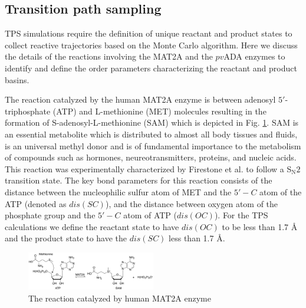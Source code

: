 \documentclass[journal=jpcbfk,manuscript=article,layout=twocolumn]{achemso}
\begin{document}
\subsection{Transition path sampling}
TPS simulations require the definition of unique reactant and product states
to collect reactive trajectories based on the Monte Carlo algorithm. Here we 
discuss the details of the reactions involving the MAT2A and the $pv$ADA enzymes 
to identify and define the order parameters characterizing the reactant and product basins.  

The reaction catalyzed by the human MAT2A enzyme is
between adenosyl $5'$-triphosphate (ATP) and L-methionine (MET) molecules resulting in the formation of
S-adenosyl-L-methionine (SAM) which is depicted in Fig. \ref{fig:mat2a-reaction}.
SAM is an essential metabolite which is distributed to almost all 
body tissues and fluids, is an universal methyl donor and is of
fundamental importance to the metabolism of compounds such as hormones, neureotransmitters, proteins, 
and nucleic acids. \cite{Friedel89Drugs38p389} This reaction was experimentally characterized by 
Firestone et al. \cite{Firestone17JAmChemSoc139p13754} to follow a S$_{\text{N}}2$ transition 
state. The key bond parameters for this reaction consists of the distance between the
nucleophilic sulfur atom of MET and the $5'-C$ atom of the ATP (denoted as $dis(SC)$), and the distance between 
oxygen atom of the phosphate group and the $5'-C$ atom of ATP ($dis(OC)$).
For the TPS calculations we define the reactant state to have $dis(OC)$ to be 
less than 1.7 {\AA} and the product state to have the $dis(SC)$ less than 1.7 {\AA}. 

\begin{figure}
\includegraphics[width=0.5\textwidth]{figures/mat2a-reaction.png}
\caption{The reaction catalyzed by human MAT2A enzyme}
\label{fig:mat2a-reaction}
\end{figure}
\end{document}
